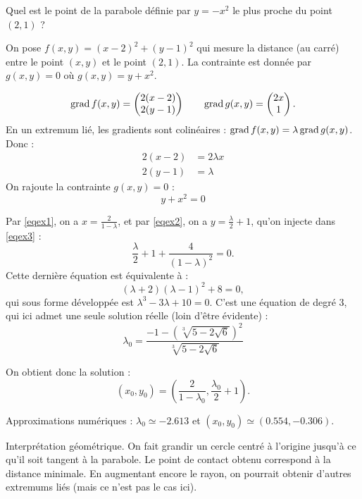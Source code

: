 \documentclass[11pt, class=report,crop=false]{standalone}
\begin{document}
\begin{exemple}
Quel est le point de la parabole définie par $y = -x^2$ le plus proche du point $(2,1)$ ?



On pose $f(x,y) = (x-2)^2+(y-1)^2$ qui mesure la distance (au carré) entre le point $(x,y)$ et le point $(2,1)$. La contrainte est donnée par 
$g(x,y) = 0$ où $g(x,y) = y+x^2$. 

$$\operatorname{grad} f(x,y) = \begin{pmatrix} 2(x-2) \\ 2(y-1) \end{pmatrix}
\qquad \operatorname{grad} g(x,y) = \begin{pmatrix} 2x \\ 1 \end{pmatrix}.$$
En un extremum lié, les gradients sont colinéaires : $\operatorname{grad} f(x,y) = \lambda \operatorname{grad} g(x,y)$. Donc :
\setcounter{equation}{0}
\begin{align}
2(x-2) &= 2\lambda x  \label{eqexx1}\\
2(y-1) &= \lambda \label{eqexx2}
\end{align}
On rajoute la contrainte $g(x,y) = 0$ :
\begin{equation}
y+x^2 = 0
\label{eqexx3}
\end{equation}

Par \eqref{eqex1}, on a $x = \frac{2}{1-\lambda}$, et par \eqref{eqex2}, on a $y = \frac\lambda2+1$, qu'on injecte dans \eqref{eqex3} :
$$\frac\lambda2+1 + \frac{4}{(1-\lambda)^2} = 0.$$
Cette dernière équation est équivalente à :
$$(\lambda+2) (\lambda-1)^2 + 8 =0,$$
qui sous forme développée est $\lambda^3-3\lambda+10=0$.
C'est une équation de degré $3$, qui ici admet une seule solution réelle (loin d'être évidente) :
$$\lambda_0 = \frac{-1-\left(\sqrt[3]{5-2\sqrt6}\right)^2}{\sqrt[3]{5-2\sqrt6}}$$

On obtient donc la solution :
$$(x_0,y_0) = \left( \frac{2}{1-\lambda_0},  \frac{\lambda_0}2+1 \right).$$




Approximations numériques :  $\lambda_0 \simeq -2.613$ et $(x_0,y_0) \simeq (0.554,-0.306)$.

Interprétation géométrique. On fait grandir un cercle centré à l'origine jusqu'à ce qu'il soit tangent à la parabole. Le point de contact obtenu correspond à la distance minimale. En augmentant encore le rayon, on pourrait obtenir d'autres extremums liés (mais ce n'est pas le cas ici).  



\end{exemple}
\end{document}
